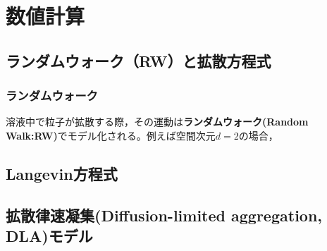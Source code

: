 \documentclass[autodetect-engine,dvi=dvipdfmx,a4paper,ja=standard,oneside,openany,11pt,draft]{bxjsarticle}
\begin{document}
\chapter{数値計算}
\section{ランダムウォーク（RW）と拡散方程式}
\subsection{ランダムウォーク}
溶液中で粒子が拡散する際，その運動は\textbf{ランダムウォーク(Random Walk:RW)}でモデル化される。例えば空間次元$d=2$の場合，

\section{Langevin方程式}
\section{拡散律速凝集(Diffusion-limited aggregation, DLA)モデル}

\ifdraft{
  
  
}{}
\end{document}
